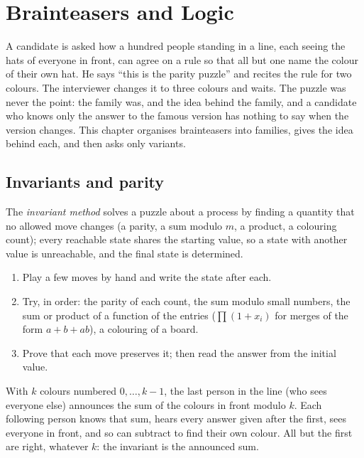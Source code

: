 \chapter{Brainteasers and Logic}\label{ch:iv:brainteasers-and-logic}

A candidate is asked how a hundred people standing in a line, each seeing the hats of everyone in front, can
agree on a rule so that all but one name the colour of their own hat. He says ``this is the parity puzzle'' and
recites the rule for two colours. The interviewer changes it to three colours and waits. The puzzle was never
the point: the family was, and the idea behind the family, and a candidate who knows only the answer to the
famous version has nothing to say when the version changes. This chapter organises brainteasers into families,
gives the idea behind each, and then asks only variants.

\section{Invariants and parity}

\begin{definition}\label{def:iv:brainteasers-and-logic:invariant}
The \emph{invariant method} solves a puzzle about a process by finding a quantity that
no allowed move changes (a parity, a sum modulo $m$, a product, a colouring count); every reachable state
shares the starting value, so a state with another value is unreachable, and the final state is determined.
\end{definition}

\begin{method}\label{met:iv:brainteasers-and-logic:invariant}
\begin{enumerate}
\item Play a few moves by hand and write the state after each.
\item Try, in order: the parity of each count, the sum modulo small numbers, the sum or product of a function
of the entries ($\prod(1 + x_i)$ for merges of the form $a + b + ab$), a colouring of a board.
\item Prove that each move preserves it; then read the answer from the initial value.
\end{enumerate}
\end{method}

\begin{example}\label{ex:iv:brainteasers-and-logic:hats}
With $k$ colours numbered $0, \dots, k-1$, the last person in the line (who sees everyone else) announces the
sum of the colours in front modulo $k$. Each following person knows that sum, hears every answer given after
the first, sees everyone in front, and so can subtract to find their own colour. All but the first are right,
whatever $k$: the invariant is the announced sum.
\end{example}

